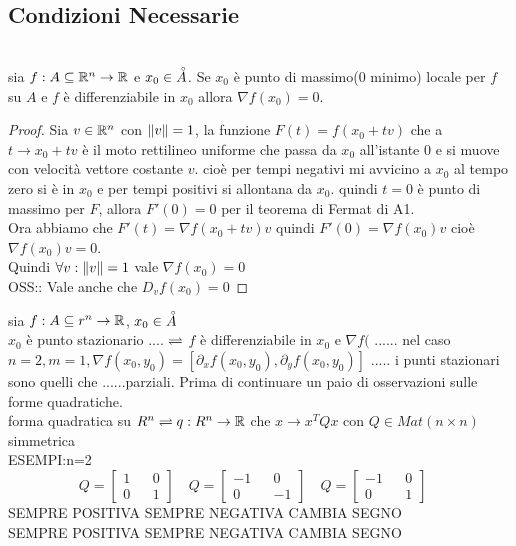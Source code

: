 \subsection{Condizioni Necessarie}
\\
sia $f:A\subseteq \mathbb{R}^n\rightarrow \mathbb{R}$ e $x_0\in\accentset{\circ}{A}$. Se $x_0$ è punto di massimo(0 minimo) locale per $f$ su $A$ e $f$ è differenziabile in $x_0$ allora $\nabla f(x_0)=0$.
\begin{proof}
	Sia $v\in \mathbb{R}^n$ con $\left\|v\right\| =1$, la funzione $F(t)= f(x_0+tv)$ che a $t\rightarrow x_0+tv$ è il moto rettilineo uniforme che passa da $x_0$ all'istante $0$ e si muove con velocità vettore costante $v$. cioè per tempi negativi mi avvicino a $x_0$ al tempo zero si è in $x_0$ e per tempi positivi si allontana da $x_0$. quindi $t=0$ è punto di massimo per $F$, allora $F'(0) = 0$ per il teorema di Fermat di A1.\\
	Ora abbiamo che $F'(t)=\nabla f(x_0+tv)v$ quindi $F'(0)=\nabla f(x_0)v$ cioè $\nabla f(x_0)v=0$.\\
	Quindi $\forall v :\left\|v\right\| =1$ vale $\nabla f(x_0)=0$\\
	OSS:: Vale anche che $D_vf(x_0)=0$
\end{proof}
sia $f:A\subseteq r^n\rightarrow \mathbb{R}$, $x_0\in\accentset{\circ}{A}$\\
$x_0$ è punto stazionario .... $\rightleftharpoons$ $f$ è differenziabile in $x_0$ e $\nabla f($ ......
\observation
nel caso $n=2, m=1, \nabla f(x_0,y_0)=[\partial_xf(x_0,y_0), \partial_yf(x_0,y_0)]$ ..... i punti stazionari sono quelli che ......parziali.
\observation
Prima di continuare un paio di osservazioni sulle forme quadratiche.\\
forma quadratica su $R^n \rightleftharpoons q:R^n\rightarrow \mathbb{R}$ che $x\rightarrow x^TQx$ con $Q\in Mat(n\times n)$ simmetrica\\
ESEMPI:n=2\\
\[
Q=\begin{bmatrix}1&&0\\0&&1\end{bmatrix}\quad
Q=\begin{bmatrix}-1&&0\\0&&-1\end{bmatrix}\quad
Q=\begin{bmatrix}-1&&0\\0&&1\end{bmatrix}\quad 
\]
SEMPRE POSITIVA SEMPRE NEGATIVA CAMBIA SEGNO\\
SEMPRE POSITIVA SEMPRE NEGATIVA CAMBIA SEGNO\\
